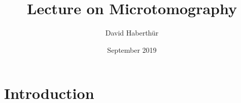 \documentclass{article}
\title{Lecture on Microtomography}
\author{David Haberthür}
\date{September 2019}
\begin{document}
\maketitle

\section{Introduction}
\end{document}
